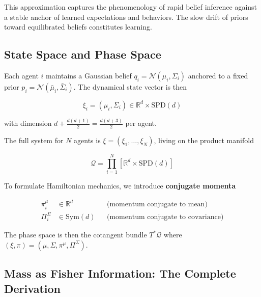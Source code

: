 \documentclass[12pt]{article}
\begin{document}
This approximation captures the phenomenology of rapid belief inference against a stable anchor of learned expectations and behaviors. The slow drift of priors toward equilibrated beliefs constitutes learning.

\subsection{State Space and Phase Space}

Each agent $i$ maintains a Gaussian belief $q_i = \mathcal{N}(\mu_i, \Sigma_i)$ anchored to a fixed prior $p_i = \mathcal{N}(\bar{\mu}_i, \bar{\Sigma}_i)$. The dynamical state vector is then

\begin{equation}
\xi_i = (\mu_i, \Sigma_i) \in \mathbb{R}^d \times \mathrm{SPD}(d)
\end{equation}

with dimension $d + \frac{d(d+1)}{2} = \frac{d(d+3)}{2}$ per agent.

The full system for $N$ agents is $\xi = (\xi_1, \ldots, \xi_N)$, living on the product manifold

\begin{equation}
\mathcal{Q} = \prod_{i=1}^N \left[\mathbb{R}^d \times \mathrm{SPD}(d)\right]
\end{equation}

To formulate Hamiltonian mechanics, we introduce \textbf{conjugate momenta}

\begin{align}
\pi_i^\mu &\in \mathbb{R}^d & &\text{(momentum conjugate to mean)} \\
\Pi_i^\Sigma &\in \mathrm{Sym}(d) & &\text{(momentum conjugate to covariance)}
\end{align}

The phase space is then the cotangent bundle $T^*\mathcal{Q}$ where $(\xi, \pi) = (\mu, \Sigma, \pi^\mu, \Pi^\Sigma)$.


\subsection{Mass as Fisher Information: The Complete Derivation}
\end{document}
